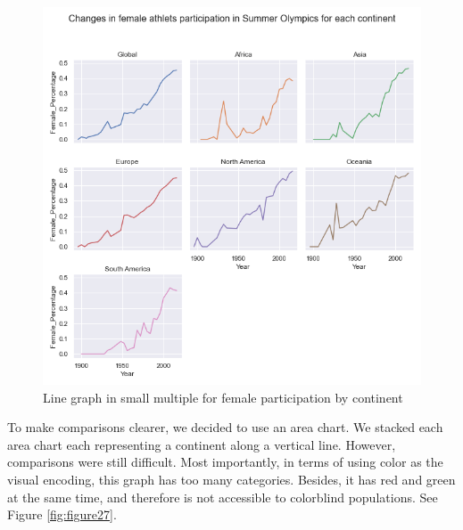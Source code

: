 \documentclass[
]{article}
\begin{document}
\begin{figure}

{\centering \includegraphics[width=1\linewidth]{static/pics/g-2-2} 

}

\caption{Line graph in small multiple for female participation by continent}\label{fig:figure26}
\end{figure}

To make comparisons clearer, we decided to use an area chart. We stacked each area chart each representing a continent along a vertical line. However, comparisons were still difficult. Most importantly, in terms of using color as the visual encoding, this graph has too many categories. Besides, it has red and green at the same time, and therefore is not accessible to colorblind populations. See Figure \ref{fig:figure27}.
\end{document}
